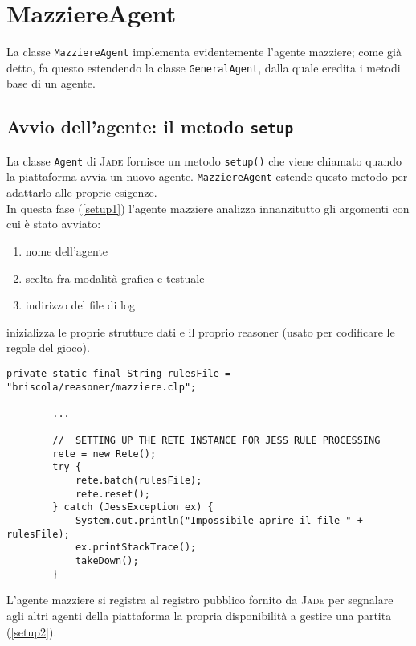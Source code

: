 \section{MazziereAgent}

La classe \texttt{MazziereAgent} implementa evidentemente l'agente mazziere; come già detto, fa questo estendendo la classe \texttt{GeneralAgent}, dalla quale eredita i metodi base di un agente.\\

\subsection{Avvio dell'agente: il metodo \texttt{setup}}
La classe \texttt{Agent} di \textsc{Jade} fornisce un metodo \texttt{setup()} che viene chiamato quando la piattaforma avvia un nuovo agente.
\texttt{MazziereAgent} estende questo metodo per adattarlo alle proprie esigenze.\\
In questa fase (\ref{setup1}) l'agente mazziere analizza innanzitutto gli argomenti con cui è stato avviato:
\begin{enumerate}
   \item nome dell'agente
   \item scelta fra modalità grafica e testuale
   \item indirizzo del file di log
\end{enumerate}
inizializza le proprie strutture dati e il proprio reasoner (usato per codificare le regole del gioco).
\begin{lstlisting}[caption={stralcio del metodo setup() di MazziereAgent: inizializzazione strutture e reasoner},label=setup1]
        private static final String rulesFile = "briscola/reasoner/mazziere.clp";
        
        ...
        
        //  SETTING UP THE RETE INSTANCE FOR JESS RULE PROCESSING
        rete = new Rete();
        try {
            rete.batch(rulesFile);
            rete.reset();
        } catch (JessException ex) {
            System.out.println("Impossibile aprire il file " + rulesFile);
            ex.printStackTrace();
            takeDown();
        }
\end{lstlisting}

\noindent
L'agente mazziere si registra al registro pubblico fornito da \textsc{Jade} per segnalare agli altri agenti della piattaforma la propria disponibilità a gestire una partita (\ref{setup2}). 

